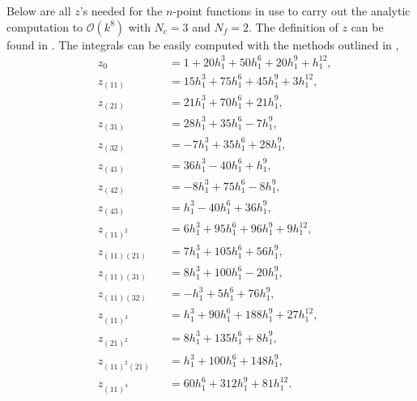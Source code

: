 Below are all $z$'s needed for the $n$-point functions in use to carry out the
analytic computation to $\mathcal{O}(k^8)$ with $N_c = 3$ and $N_f = 2$. The
definition of $z$ can be found in . The integrals
can be easily computed with the methods outlined in ,
%
\begin{subequations}
\begin{alignat}{4}
  &z_0 &&= 1 + 20 h_1^3 + 50 h_1^6 + 20 h_1^9 + h_1^{12}, \\
  &z_{(11)} &&= 15 h_1^3 + 75 h_1^6 + 45 h_1^9 + 3 h_1^{12}, \\
  &z_{(21)} &&= 21 h_1^3 + 70 h_1^6 + 21 h_1^9, \\
  &z_{(31)} &&= 28 h_1^3 + 35 h_1^6 - 7 h_1^9, \\
  &z_{(32)} &&= -7 h_1^3 + 35 h_1^6 + 28 h_1^9, \\
  &z_{(41)} &&= 36 h_1^3 - 40 h_1^6 + h_1^9, \\
  &z_{(42)} &&= -8 h_1^3 + 75 h_1^6 - 8 h_1^9, \\
  &z_{(43)} &&= h_1^3 - 40 h_1^6 + 36 h_1^9, \\
  &z_{(11)^2} &&= 6 h_1^3 + 95 h_1^6 + 96 h_1^9 + 9 h_1^{12}, \\
  &z_{(11)(21)} &&= 7 h_1^3 + 105 h_1^6 + 56 h_1^9, \\
  &z_{(11)(31)} &&= 8 h_1^3 + 100 h_1^6 - 20 h_1^9, \\
  &z_{(11)(32)} &&= -h_1^3 + 5 h_1^6 + 76 h_1^9, \\
  &z_{(11)^3} &&= h_1^3 + 90 h_1^6 + 188 h_1^9 + 27 h_1^{12}, \\
  &z_{(21)^2} &&= 8 h_1^3 + 135 h_1^6 + 8 h_1^9, \\
  &z_{(11)^2(21)} &&= h_1^3 + 100 h_1^6 + 148 h_1^9, \\
  &z_{(11)^4} &&= 60 h_1^6 + 312 h_1^9 + 81 h_1^{12}.
\end{alignat}
\end{subequations}

